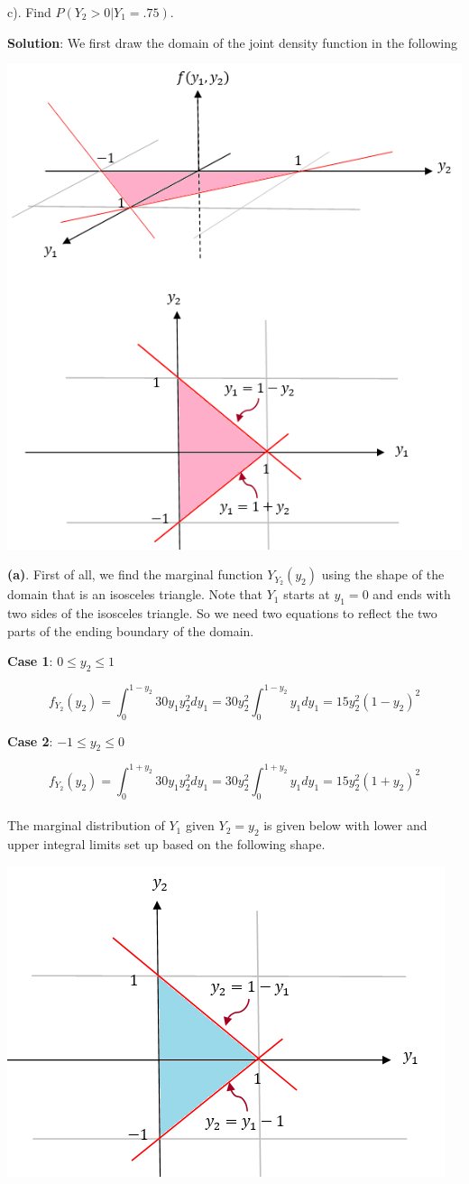 \documentclass[
]{book}
\begin{document}
c). Find \(P(Y_2 > 0|Y_1 = .75)\).

\textbf{Solution}: We first draw the domain of the joint density function in the following

\begin{center}\includegraphics[width=0.45\linewidth]{topic07/example09Domain} \end{center}

\textbf{(a)}. First of all, we find the marginal function \(Y_{Y_2}(y_2)\) using the shape of the domain that is an isosceles triangle. Note that \(Y_1\) starts at \(y_1=0\) and ends with two sides of the isosceles triangle. So we need two equations to reflect the two parts of the ending boundary of the domain.

\textbf{Case 1}: \(0 \le y_2 \le 1\)

\[
f_{Y_2}(y_2) = \int_0^{1-y_2} 30y_1y_2^2dy_1 = 30y_2^2\int_0^{1-y_2}y_1dy_1 =15y_2^2(1-y_2)^2 
\]

\textbf{Case 2}: \(-1 \le y_2 \le 0\)

\[
f_{Y_2}(y_2) = \int_0^{1+y_2} 30y_1y_2^2dy_1=30y_2^2\int_0^{1+y_2}y_1dy_1 =15y_2^2(1+y_2)^2 
\]\\

The marginal distribution of \(Y_1\) given \(Y_2 = y_2\) is given below with lower and upper integral limits set up based on the following shape.

\begin{center}\includegraphics[width=0.55\linewidth]{topic07/example09CondY2} \end{center}
\end{document}
